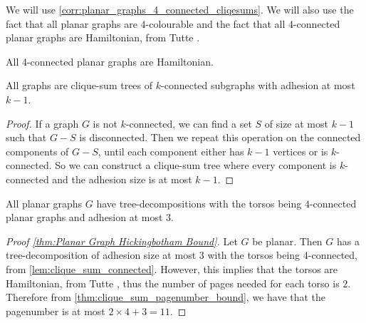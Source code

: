 We will use \cref{corr:planar_graphs_4_connected_cliqesums}. We will also use the fact that all planar graphs are \(4\)-colourable \cite{appelEveryPlanarMap1989} and the fact that all 4-connected planar graphs are Hamiltonian, from Tutte \cite{tutteTheoremPlanarGraphs1956}.

\begin{theorem}\label{thm:4-connected_planar_ham_cycle}
	All 4-connected planar graphs are Hamiltonian.
\end{theorem}

\begin{lemma}\label{lem:clique_sum_connected}
	All graphs are clique-sum trees of \(k\)-connected subgraphs with adhesion at most \(k-1\).
\end{lemma}
\begin{proof}
	If a graph \(G\) is not \(k\)-connected, we can find a set \(S\) of size at most \(k-1\) such that \(G - S\) is disconnected. Then we repeat this operation on the connected components of \(G - S\), until each component either has \(k-1\) vertices or is \(k\)-connected. So we can construct a clique-sum tree where every component is \(k\)-connected and the adhesion size is at most \(k-1\). 
\end{proof}

\begin{corollary}\label{corr:planar_graphs_4_connected_cliqesums}
	All planar graphs \(G\) have tree-decompositions with the torsos being \(4\)-connected planar graphs and adhesion at most \(3\).
\end{corollary}


\begin{proof}[Proof \cref{thm:Planar Graph Hickingbotham Bound}]
	Let \(G\) be planar. Then \(G\) has a tree-decomposition of adhesion size at most \(3\) with the torsos being \(4\)-connected, from \cref{lem:clique_sum_connected}. However, this implies that the torsos are Hamiltonian, from Tutte \cite{tutteTheoremPlanarGraphs1956}, thus the number of pages needed for each torso is \(2\). Therefore from \cref{thm:clique_sum_pagenumber_bound}, we have that the pagenumber is at most \(2 \times 4 + 3 = 11\). 
\end{proof}


